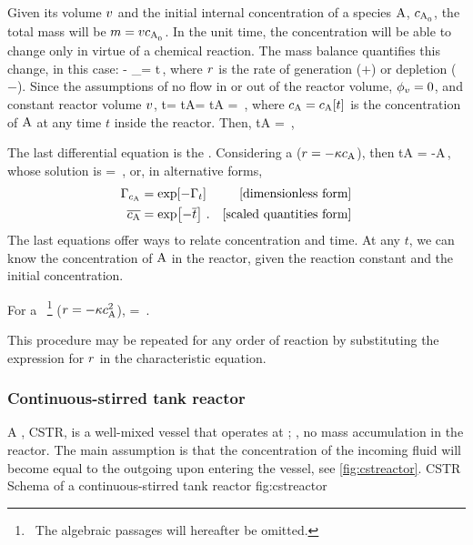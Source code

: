 Given its volume $v$ and the initial internal concentration of a species $\ce A$, $\conc{A,0}$, the total mass will be $\mass = \vol\conc{A,0}$. In the unit time, the concentration will be able to change only in virtue of a chemical reaction. The mass balance quantifies this change, in this case:
\beq
\flow\vol{} - \flow\vol{} \pm \int_\vol\rrate\dx\vol = \iod t\mass\,,
\eeq
where $r$ is the rate of generation ($+$) or depletion ($-$). Since the assumptions of no flow in or out of the reactor volume, $\phi_{v} = 0$, and constant reactor volume $v$,
\beq
\iod t\mass = \iod t\conc A\vol = \vol\iod t\conc A = \vol\rrate\,,
\eeq
where $\conc A = \conc A\vat t$ is the concentration of $\ce A$ at any time $t$ inside the reactor. Then,
\beq
\iod t\conc A = \rrate\,,
\eeq

The last differential equation is the . Considering a  ($\rrate = -\krcoeff\conc A$), then
\beq
\iod t\conc A = -\krcoeff\conc A\,,
\eeq
whose solution is
\beq
{} = \exp{}\,,
\eeq
or, in alternative forms,
\begin{align*}
\kdim_{\conc A} &= \exp\vat{-\kdim_t}    & \text{[dimensionless form]} \\
 \scpq{\conc A} &= \exp\vat{-\scpq t}\,. & \text{[scaled quantities form]}
\end{align*}
The last equations offer ways to relate concentration and time. At any $t$, we can know the concentration of $\ce A$ in the reactor, given the reaction constant and the initial concentration.

For a ~\footnote{~The algebraic passages will hereafter be omitted.} ($\rrate = -\krcoeff\conc A^2$),
\beq
{} = \,.
\eeq

This procedure may be repeated for any order of reaction by substituting the expression for $r$ in the
characteristic equation. 


\subsubsection{Continuous-stirred tank reactor}
A , CSTR, is a well-mixed vessel that operates at ; \ie, no mass accumulation in the reactor. The main assumption is that the concentration of the incoming fluid will become  equal to the outgoing upon entering the vessel, see \cref{fig:cstreactor}.
%
   {CSTR}
   {Schema of a continuous-stirred tank reactor}%
   {fig:cstreactor}%

